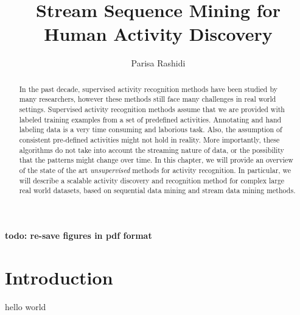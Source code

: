 \documentclass{elsarticle}
\theoremstyle{definition}
\begin{document}
\begin{frontmatter}

\title{Stream Sequence Mining for Human Activity Discovery}

\author{Parisa Rashidi}
\address{Biomedical Informatics Division, \\ Health and Engineering Center, \\ Northwestern University, \\ Chicago, IL, US}

\begin{abstract}
In the past decade, supervised activity recognition methods have been studied by many researchers, however these methods still face many challenges in real world settings. Supervised activity recognition methods assume that we are provided with labeled training examples from a set of predefined activities. Annotating and hand labeling data is a very time consuming and laborious task. Also, the assumption of consistent pre-defined activities might not hold in reality. More importantly, these algorithms do not take into account the streaming nature of data, or the possibility that the patterns might change over time. In this chapter, we will provide an overview of the state of the art \emph{unsupervised} methods for activity recognition. In particular, we will describe a scalable activity discovery and recognition method for complex large real world datasets, based on sequential data mining and stream data mining methods.
\end{abstract}

\end{frontmatter}

\textbf{todo: re-save figures in pdf format}
\section{Introduction}
hello world
\end{document}
